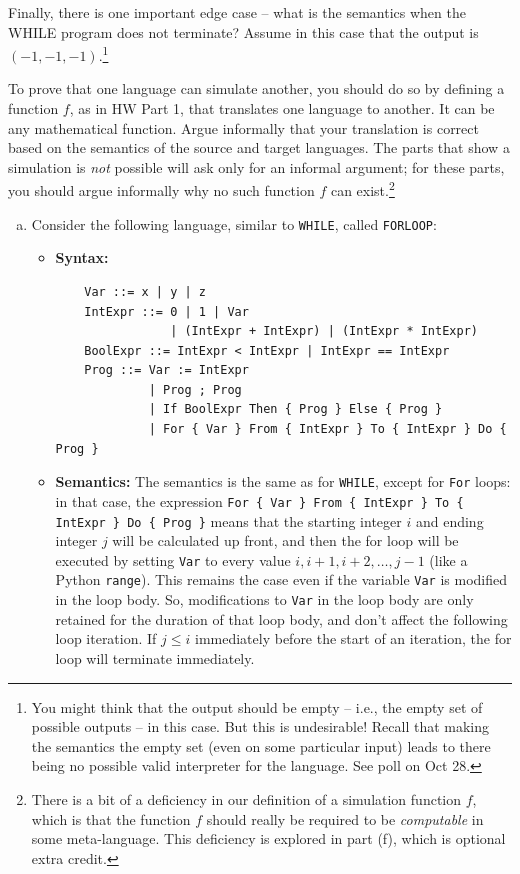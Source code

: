 \documentclass{article}
\theoremstyle{plain}
\begin{document}
\begin{enumerate}
\begin{itemize}
Finally, there is one important edge case -- what is the semantics when the WHILE program does not terminate?
Assume in this case that the output is $(-1, -1, -1)$.\footnote{
    You might think that the output should be empty -- i.e., the empty set of possible outputs -- in this case. But this is undesirable! Recall that making the semantics the empty set
    (even on some particular input) leads to there being no possible valid interpreter for the language. See poll on Oct 28.
}
\end{itemize}

To prove that one language can simulate another,
you should do so by defining a function $f$,
as in HW Part 1, that translates one language to another.
It can be any mathematical function.
Argue informally that your translation is correct based on the semantics of the source and target languages.
The parts that show a simulation is \emph{not} possible
will ask only for an informal argument;
for these parts, you should argue informally why no such function $f$ can exist.\footnote{
    There is a bit of a deficiency in our definition of
    a simulation function $f$, which is that the function $f$
    should really be required to be \emph{computable} in some meta-language.
    This deficiency is explored in part (f), which is optional extra credit.
}

\begin{enumerate}[(a)]
\item
Consider the following language, similar to \texttt{WHILE}, called \texttt{FORLOOP}:

\begin{itemize}
\item
\textbf{Syntax:}
\begin{verbatim}
    Var ::= x | y | z
    IntExpr ::= 0 | 1 | Var
                | (IntExpr + IntExpr) | (IntExpr * IntExpr)
    BoolExpr ::= IntExpr < IntExpr | IntExpr == IntExpr
    Prog ::= Var := IntExpr
             | Prog ; Prog
             | If BoolExpr Then { Prog } Else { Prog }
             | For { Var } From { IntExpr } To { IntExpr } Do { Prog }
\end{verbatim}

\item
\textbf{Semantics:}
The semantics is the same as for \texttt{WHILE},
except for \texttt{For} loops:
in that case, the expression \texttt{For \{ Var \} From \{ IntExpr \} To \{ IntExpr \} Do \{ Prog \}} means that the starting integer $i$ and ending integer $j$ will be calculated up front, and then the for loop will be executed by setting \texttt{Var} to every value $i, i + 1, i + 2, \ldots, j - 1$ (like a Python \texttt{range}).
This remains the case even if the variable \texttt{Var} is modified in the loop body. So, modifications to \texttt{Var} in the loop body are only retained for the duration of that loop body, and don't affect the following loop iteration.
If $j \le i$ immediately before the start of an iteration, the for loop will terminate immediately.
\end{itemize}


\end{enumerate}
\end{enumerate}
\end{document}
